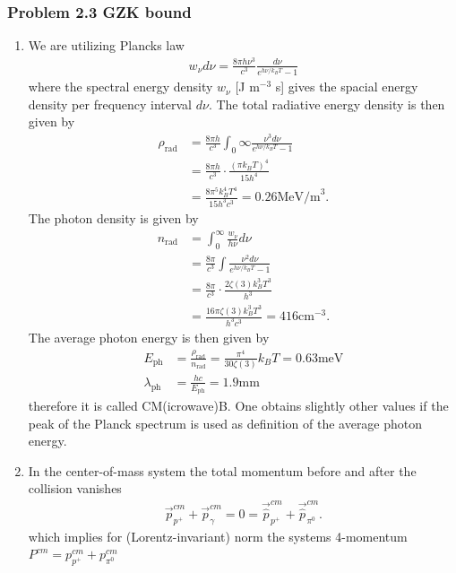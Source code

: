 \documentclass[10pt,a4paper]{article}
\theoremstyle{definition}
\begin{document}
\subsubsection{Problem 2.3 GZK bound}
\begin{enumerate}
    \item We are utilizing Plancks law
    \begin{align}
        w_\nu d\nu = \frac{8\pi h\nu^3}{c^3}\frac{d\nu}{e^{h\nu/k_BT}-1}
    \end{align}
    where the spectral energy density $w_\nu$ [J m$^{-3}$ s] gives the spacial energy density per frequency interval $d\nu$. The total radiative energy density is then given by
    \begin{align}
        \rho_\text{rad} &= \frac{8\pi h}{c^3}\int_0\infty \frac{\nu^3d\nu}{e^{h\nu/k_BT}-1}\\
        &=\frac{8\pi h}{c^3}\cdot\frac{(\pi k_B T)^4}{15h^4}\\
        &=\frac{8\pi^5k_B^4 T^4}{15h^3 c^3}=0.26\text{MeV/m}^3.
    \end{align}
    The photon density is given by
    \begin{align}
        n_\text{rad} &=\int_0^\infty\frac{w_\nu}{h\nu}d\nu\\
        &= \frac{8\pi}{c^3}\int \frac{\nu^2d\nu}{e^{h\nu/k_BT}-1}\\
        &=\frac{8\pi}{c^3}\cdot\frac{2\zeta(3) k_B^3 T^3}{h^3}\\
        &=\frac{16\pi\zeta(3) k_B^3 T^3}{h^3c^3}=416\text{cm}^{-3}.
    \end{align}
    The average photon energy is then given by
    \begin{align}
        E_\text{ph}&=\frac{\rho_\text{rad}}{n_\text{rad}}=\frac{\pi^4}{30\zeta(3)}k_BT=0.63\text{meV}\\
        \lambda_\text{ph}&=\frac{hc}{E_\text{ph}}=1.9\text{mm}
    \end{align}
    therefore it is called CM(icrowave)B.
    One obtains slightly other values if the peak of the Planck spectrum is used as definition of the average photon energy.
    \item In the center-of-mass system the total momentum before and after the collision vanishes
    \begin{align}
        \vec{p}_{p^+}^{cm}+\vec{p}_\gamma^{cm}=0=\vec{\hat{p}}_{p^+}^{cm}+\vec{\hat{p}}_{\pi^0}^{cm}.
    \end{align}
    which implies for (Lorentz-invariant) norm the systems 4-momentum $P^{cm}=p_{p^+}^{cm}+p_{\pi^0}^{cm}$

\end{enumerate}
\end{document}
